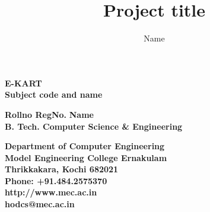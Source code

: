 \documentclass[11pt]{report}
\begin{document}
\renewcommand\bibname{References}
\pagestyle{fancy}
\fancyheadz{}
\fancyfoot{}
\fancyfoot[c]{\thepage}
\renewcommand{\chaptermark}[1]{
\markboth{\thechapter.\ #1}{}} 
\renewcommand{\headrulewidth}{0.1pt}
\fancyhead[r]{\slshape \leftmark}
\addtolength{\headheight}{\baselineskip}

\lhead{\nouppercase{\rightmark}}
\rhead{\nouppercase{\leftmark}}
%
\title {Project title}
\author {Name}

\begin{titlepage}
\begin{center}

\Huge{\textbf{E-KART}}\\
\large{\textbf{Subject  code and name\\}}
\vspace{1.2in}

\Large{\textbf{Rollno
RegNo.
}}	\hspace{.1in}	\Large{\textbf{Name}}\\ 

\Large{\textbf{
B. Tech. Computer Science \& Engineering
}}


\vspace{.6in}
\begin{figure}[h]
\begin{center}
\end{center}
\end{figure}
\textbf{
Department of Computer Engineering\\
Model Engineering College Ernakulam\\
Thrikkakara, Kochi 682021\\
Phone: +91.484.2575370\\
http://www.mec.ac.in \\
hodcs@mec.ac.in
}
\end{center}
\end{titlepage}
\end{document}

